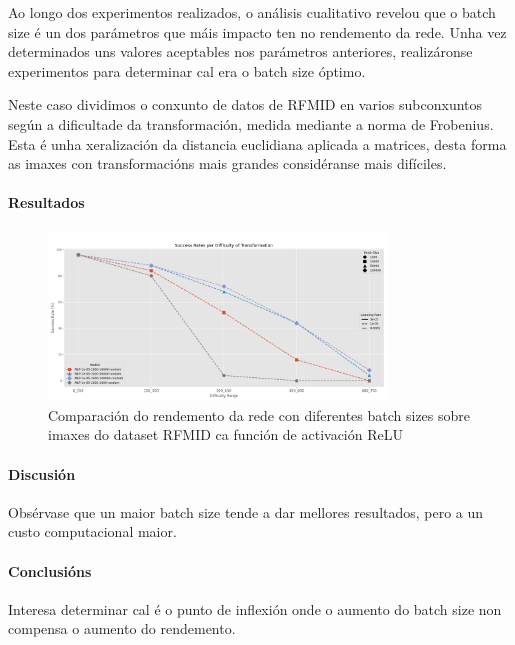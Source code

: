 Ao longo dos experimentos realizados, o análisis cualitativo revelou que o batch size é un dos parámetros que máis impacto ten no rendemento da rede.
Unha vez determinados uns valores aceptables nos parámetros anteriores, realizáronse experimentos para determinar cal era o batch size óptimo.

Neste caso dividimos o conxunto de datos de RFMID en varios subconxuntos según a dificultade da transformación, medida mediante a norma de Frobenius.
Esta é unha xeralización da distancia euclidiana aplicada a matrices, desta forma as imaxes con transformacións mais grandes considéranse mais difíciles.


\paragraph{Resultados}
\label{par:Resultados}


\begin{figure}[ht]
    \centering
    \includegraphics[width=0.8\textwidth]{imaxes/experiment_plot_RFMID_MLP_1e-05.png}
    \caption{Comparación do rendemento da rede con diferentes batch sizes sobre imaxes do dataset RFMID ca función de activación ReLU}
    \label{fig:batch_size_comparison_relu}
\end{figure}

\paragraph{Discusión}
\label{par:Discusión}

Obsérvase que un maior batch size tende a dar mellores resultados, pero a un custo computacional maior. 

\paragraph{Conclusións}
\label{par:Conclusións}

Interesa determinar cal é o punto de inflexión onde o aumento do batch size non compensa o aumento do rendemento.

